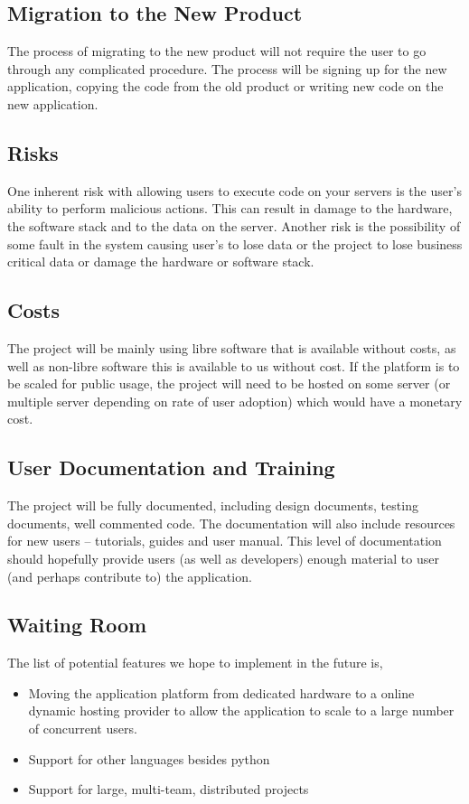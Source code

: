 \documentclass[12pt, titlepage]{article}
\begin{document}
  \subsection{Migration to the New Product}
	The process of migrating to the new product will not require the user to go
	through any complicated procedure. The process will be signing up for the new
	application, copying the code from the old product or writing new code on the
	new application.

  \subsection{Risks}
  One inherent risk with allowing users to execute code on your servers is the
  user's ability to perform malicious actions. This can result in damage to the
  hardware, the software stack and to the data on the server.  Another risk is
  the possibility of some fault in the system causing user's to lose data or
  the project to lose business critical data or damage the hardware or software
  stack.

  \subsection{Costs}
  The project will be mainly using libre software that
  is available without costs, as well as non-libre software this is available
  to us without cost. If the platform is to be scaled for public usage, the
  project will need to be hosted on some server (or multiple server depending
  on rate of user adoption) which would have a monetary cost.

  \subsection{User Documentation and Training}
	The project will be fully documented, including design documents, testing
	documents, well commented code. The documentation will also include resources
	for new users -- tutorials, guides and user manual. This level of
	documentation should hopefully provide users (as well as developers) enough
	material to user (and perhaps contribute to) the application.

  \subsection{Waiting Room}
	The list of potential features we hope to implement in the future is,
	\begin{itemize}
		\item Moving the application platform from dedicated hardware to a online
			dynamic hosting provider to allow the application to scale to a large
			number of concurrent users.
		\item Support for other languages besides python
		\item Support for large, multi-team, distributed projects
	\end{itemize}
\end{document}
